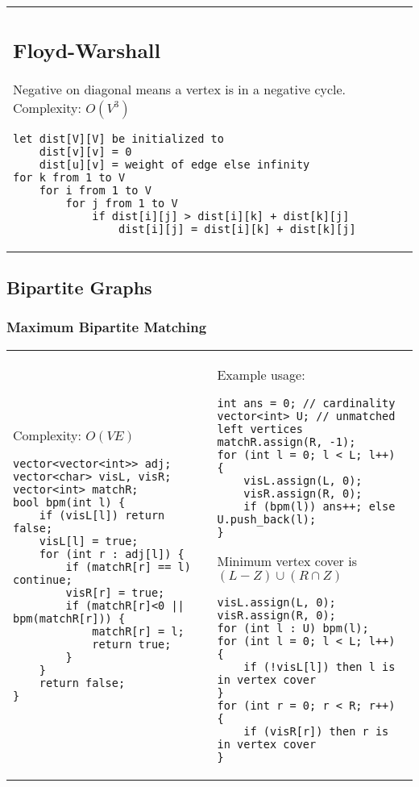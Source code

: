\documentclass[letterpaper]{article}
\begin{document}
\begin{tabular}{@{}p{9cm}p{9cm}@{}}
\subsection{Floyd-Warshall}

Negative on diagonal means a vertex is in a negative cycle. Complexity: $O\left(V^3\right)$

\begin{lstlisting}
let dist[V][V] be initialized to
	dist[v][v] = 0
	dist[u][v] = weight of edge else infinity
for k from 1 to V
	for i from 1 to V
		for j from 1 to V
			if dist[i][j] > dist[i][k] + dist[k][j]
				dist[i][j] = dist[i][k] + dist[k][j]
\end{lstlisting}

\end{tabular}

\clearpage
\subsection{Bipartite Graphs}
\subsubsection{Maximum Bipartite Matching}
\begin{tabular}{@{}p{9cm}p{9cm}@{}}
Complexity: $O\left(VE\right)$
\begin{lstlisting}
vector<vector<int>> adj;
vector<char> visL, visR;
vector<int> matchR;
bool bpm(int l) {
	if (visL[l]) return false;
	visL[l] = true;
	for (int r : adj[l]) {
		if (matchR[r] == l) continue;
		visR[r] = true;
		if (matchR[r]<0 || bpm(matchR[r])) {
			matchR[r] = l;
			return true;
		}
	}
	return false;
}
\end{lstlisting}
&
Example usage:
\begin{lstlisting}
int ans = 0; // cardinality
vector<int> U; // unmatched left vertices
matchR.assign(R, -1);
for (int l = 0; l < L; l++) {
	visL.assign(L, 0);
	visR.assign(R, 0);
	if (bpm(l)) ans++; else U.push_back(l);
}
\end{lstlisting}

Minimum vertex cover is $\left(L-Z\right) \cup \left(R \cap Z\right)$
\begin{lstlisting}
visL.assign(L, 0);
visR.assign(R, 0);
for (int l : U) bpm(l);
for (int l = 0; l < L; l++) {
	if (!visL[l]) then l is in vertex cover
}
for (int r = 0; r < R; r++) {
	if (visR[r]) then r is in vertex cover
}
\end{lstlisting}
\end{tabular}
\end{document}
